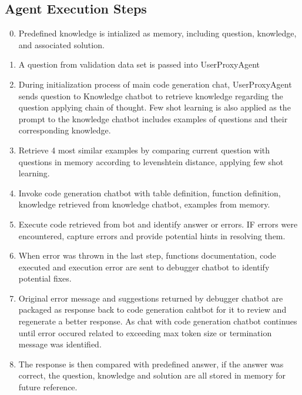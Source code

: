 \documentclass[acmsmall]{acmart}
\begin{document}
\subsection{Agent Execution Steps}
\begin{enumerate}
  \setcounter{enumi}{-1}
  \item Predefined knowledge is intialized as memory, including question, knowledge, and associated solution.
  \item A question from validation data set is passed into UserProxyAgent 
  \item During initialization process of main code generation chat, UserProxyAgent sends question to Knowledge 
  chatbot to retrieve knowledge regarding the question applying chain of thought. Few shot learning is also 
  applied as the prompt to the knowledge chatbot includes examples of questions and their corresponding knowledge. 
  \item Retrieve 4 most similar examples by comparing current question with questions in memory according to 
  levenshtein distance, applying few shot learning.
  \item Invoke code generation chatbot with table definition, function definition, knowledge retrieved from 
  knowledge chatbot, examples from memory.
  \item Execute code retrieved from bot and identify answer or errors. IF errors were encountered, 
  capture errors and provide potential hints in resolving them.
  \item When error was thrown in the last step, functions documentation, code executed and execution error 
  are sent to debugger chatbot to identify potential fixes.
  \item Original error message and suggestions returned by debugger chatbot are packaged as response back to 
  code generation cahtbot for it to review and regenerate a better response. As chat with code generation 
  chatbot continues until error occured related to exceeding max token size or termination message was identified.
  \item The response is then compared with predefined answer, if the answer was correct, the question, knowledge 
  and solution are all stored in memory for future reference.
\end{enumerate}
\end{document}
